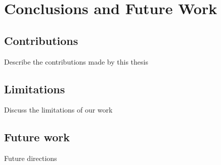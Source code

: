 \chapter{Conclusions  and Future Work}

\section{Contributions} Describe the contributions made by this thesis

\section{Limitations} Discuss the limitations of our work

\section{Future work} Future directions
